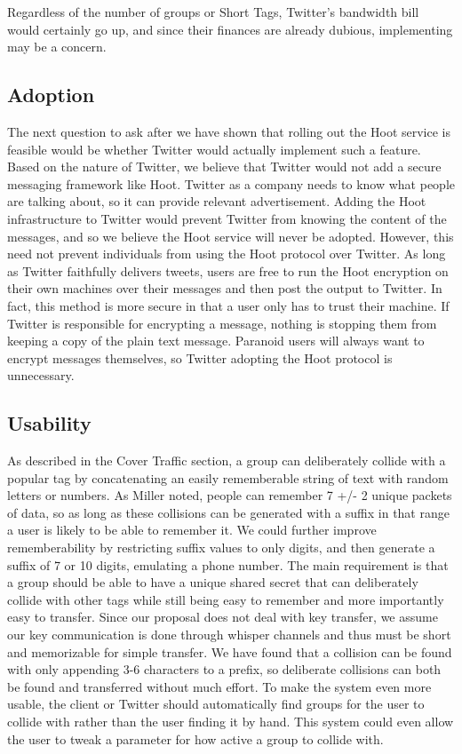 Regardless of the number of groups or Short Tags, Twitter's bandwidth bill would certainly go up, and since their finances are already dubious, implementing \hoot may be a concern.

\subsection{Adoption}	

The next question to ask after we have shown that rolling out the Hoot service is feasible would be whether Twitter would actually implement such a feature. Based on the nature of Twitter, we believe that Twitter would not add a secure messaging framework like Hoot. Twitter as a company needs to know what people are talking about, so it can provide relevant advertisement. Adding the Hoot infrastructure to Twitter would prevent Twitter from knowing the content of the messages, and so we believe the Hoot service will never be adopted. However, this need not prevent individuals from using the Hoot protocol over Twitter. As long as Twitter faithfully delivers tweets, users are free to run the Hoot encryption on their own machines over their messages and then post the output to Twitter. In fact, this method is more secure in that a user only has to trust their machine. If Twitter is responsible for encrypting a message, nothing is stopping them from keeping a copy of the plain text message. Paranoid users will always want to encrypt messages themselves, so Twitter adopting the Hoot protocol is unnecessary.
		
\subsection{Usability}

As described in the Cover Traffic section, a group can deliberately collide with a popular tag by concatenating an easily rememberable string of text with random letters or numbers. As Miller\cite{miller56} noted, people can remember  
7 +/- 2 unique packets of data, so as long as these collisions can be generated with a suffix in that range a user is likely to be able to remember it. We could further improve rememberability by restricting suffix values to only digits, and then generate a suffix of 7 or 10 digits, emulating a phone number. The main requirement is that a group should be able to have a unique shared secret that can deliberately collide with other tags while still being easy to remember and more importantly easy to transfer. Since our proposal does not deal with key transfer, we assume our key communication is done through whisper channels and thus must be short and memorizable for simple transfer. We have found that a collision can be found with only appending 3-6 characters to a prefix, so deliberate collisions can both be found and transferred without much effort. To make the system even more usable, the client or Twitter should automatically find groups for the user to collide with rather than the user finding it by hand. This system could even allow the user to tweak a parameter for how active a group to collide with.

